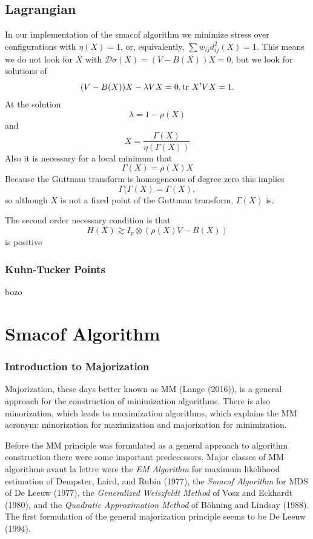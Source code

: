 \documentclass[
  12pt,
]{article}
\begin{document}
\subsection{Lagrangian}\label{lagrangian}

In our implementation of the smacof algorithm we minimize stress over
configurations with \(\eta(X)=1\), or, equivalently,
\(\sum w_{ij}d_{ij}^2(X)=1\). This means we do not look for \(X\) with
\(\mathcal{D}\sigma(X)=(V-B(X))X=0\), but we look for solutions of \[
(V-B(X))X-\lambda VX=0,\\
\text{tr}\ X'VX= 1.
\] At the solution \[
\lambda=1-\rho(X)
\] and \[
X = \frac{\Gamma(X)}{\eta(\Gamma(X))}
\] Also it is necessary for a local minimum that \[
\Gamma(X)=\rho(X)X
\] Because the Guttman transform is homogeneous of degree zero this
implies \[
\Gamma(\Gamma(X)=\Gamma(X),
\] so although \(X\) is not a fixed point of the Guttman transform,
\(\Gamma(X)\) is.

The second order necessary condition is that \[
H(X)\gtrsim I_p\otimes (\rho(X)V - B(X))
\] is positive

\subsubsection{Kuhn-Tucker Points}\label{kuhn-tucker-points}

bozo

\section{Smacof Algorithm}\label{smacof-algorithm}

\subsubsection{Introduction to Majorization}\label{introduction-to-majorization}

Majorization, these days better known as MM (Lange (2016)), is a general
approach for the construction of minimization algorithms. There is also
minorization, which leads to maximization algorithms, which explains the
MM acronym: minorization for maximization and majorization for
minimization.

Before the MM principle was formulated as a general approach to
algorithm construction there were some important predecessors. Major
classes of MM algorithms avant la lettre were the \emph{EM Algorithm} for
maximum likelihood estimation of Dempster, Laird, and Rubin (1977), the \emph{Smacof
Algorithm} for MDS of De Leeuw (1977), the \emph{Generalized Weiszfeldt Method}
of Vosz and Eckhardt (1980), and the \emph{Quadratic Approximation Method} of
Böhning and Lindsay (1988). The first formulation of the general majorization
principle seems to be De Leeuw (1994).
\end{document}
